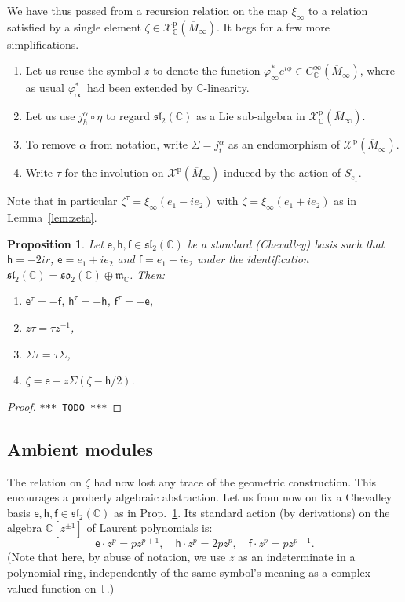 \documentclass{article}
\def\MISS{\texttt{*** TODO ***}}
\def\fsl{\mathfrak{sl}}
\def\fso{\mathfrak{so}}
\def\fm{\mathfrak{m}}
\def\CC{\mathbb{C}}
\def\TT{\mathbb{T}}
\def\XX{\mathcal{X}}
\def\inv{\tau} %
\def\e{\mathsf{e}}
\def\h{\mathsf{h}}
\def\f{\mathsf{f}}
\def\p{\mathrm{p}}
\newtheorem{prop}{Proposition}
\theoremstyle{definition}
\begin{document}
We have thus passed from a recursion relation
on the map $\xi_\infty$ to a relation satisfied by 
a single element $\zeta \in \XX^\p_\CC(\overline M_\infty)$.
It begs for a few more simplifications.
\begin{enumerate}
        \item Let us reuse the symbol $z$ to denote the function
$\varphi^*_\infty e^{i\phi} \in C^\infty_\CC(\overline M_\infty)$,
where as usual $\varphi^*_\infty$ had been extended
by $\CC$-linearity. 
\item Let us
use $j^\alpha_h \circ \eta$ to regard 
$\fsl_2(\CC)$ as a Lie sub-algebra in $\XX^\p_\CC(\overline M_\infty)$.
\item 
To remove $\alpha$ from notation, write $\Sigma = j^\alpha_t$ as an endomorphism of $\XX^\p(\overline M_\infty)$.
\item
        Write $\inv$ for the involution on $\XX^\p(\overline M_\infty)$
        induced by the action of $S_{e_1}$.
\end{enumerate}
Note that in particular $\zeta^\inv = \xi_\infty(e_1 - ie_2)$
with $\zeta = \xi_\infty(e_1+ie_2)$ as in Lemma~\ref{lem:zeta}.
\begin{prop}\label{prop:zeta}
        Let $\e,\h,\f \in \fsl_2(\CC)$ be a standard (Chevalley) basis
        such that $\h = -2ir$, $\e = e_1 + ie_2$ and $\f = e_1 - ie_2$ under the identification
        $\fsl_2(\CC) = \fso_2(\CC) \oplus \fm_\CC$. 
        Then:
        \begin{enumerate}
                \item $\e^\inv=-\f$, $\h^\inv=-\h$, $\f^\inv=-\e$,
                \item $z\inv = \inv z^{-1}$,
                \item $\Sigma\inv = \inv\Sigma$,
                \item $\zeta = \e + z\Sigma(\zeta - \h/2)$.
        \end{enumerate}
\end{prop}
\begin{proof}
        \MISS
\end{proof}

\subsection{Ambient modules}
The relation on $\zeta$ 
had now lost any trace
of the geometric construction. This encourages
a proberly algebraic abstraction. Let us from now on fix
a Chevalley basis $\e,\h,\f \in \fsl_2(\CC)$ as in 
Prop.~\ref{prop:zeta}. Its standard action
(by derivations) on the algebra $\CC[z^{\pm1}]$ of Laurent polynomials is:
$$ \e\cdot z^p=pz^{p+1},\quad \h\cdot z^p=2pz^p,\quad \f\cdot z^p=pz^{p-1}. $$ 
(Note that here, by abuse of notation, we use $z$ as an indeterminate in a polynomial ring,
independently of the same symbol's meaning as a complex-valued function on $\TT$.)
\end{document}

